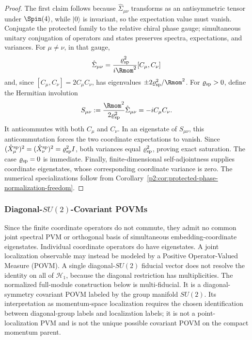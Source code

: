 \documentclass[11pt,a4paper]{article}
\begin{document}
\begin{proof}
The first claim follows because \(\hat\Sigma_{\mu\nu}\) transforms as an
antisymmetric tensor under \(\Spin(4)\), while \(|0\rangle\) is invariant,
so the expectation value must vanish.  Conjugate the protected family to the
relative chiral phase gauge; simultaneous unitary conjugation of operators
and states preserves spectra, expectations, and variances.  For
\(\mu\ne\nu\), in that gauge,
\[
\hat\Sigma_{\mu\nu}
=\frac{\varrho_{\rm sp}^2}{i\Rmom^2}[C_\mu,C_\nu]
\]
and, since \([C_\mu,C_\nu]=2C_\mu C_\nu\), has eigenvalues
\(\pm2\varrho_{\rm sp}^2/\Rmom^2\).  For
\(\varrho_{\rm sp}>0\), define the Hermitian involution
\[
S_{\mu\nu}
:=
\frac{\Rmom^2}{2\varrho_{\rm sp}^2}\hat\Sigma_{\mu\nu}
=-iC_\mu C_\nu.
\]
It anticommutes with both \(C_\mu\) and \(C_\nu\).  In an eigenstate of
\(S_{\mu\nu}\), this anticommutation forces the two coordinate expectations
to vanish.  Since
\((\hat X_\mu^{\rm sp})^2=(\hat X_\nu^{\rm sp})^2
=\varrho_{\rm sp}^2I\), both variances equal
\(\varrho_{\rm sp}^2\), proving exact saturation.  The case
\(\varrho_{\rm sp}=0\) is immediate.  Finally, finite-dimensional
self-adjointness supplies coordinate eigenstates, whose corresponding
coordinate variance is zero.  The numerical specializations follow from
Corollary~\ref{p2:cor:protected-phase-normalization-freedom}.
\end{proof}


\subsubsection{Diagonal-\texorpdfstring{$SU(2)$}{SU(2)}-Covariant POVMs}
Since the finite coordinate operators do not commute, they admit no common
joint spectral PVM or orthogonal basis of simultaneous embedding-coordinate
eigenstates.  Individual coordinate operators do have eigenstates.  A
joint localization observable may instead be modeled by a Positive
Operator-Valued Measure (POVM).  A single diagonal-$SU(2)$ fiducial vector
does not resolve the identity on all of $\mathcal H_1$, because the diagonal
restriction has multiplicities.  The normalized full-module construction
below is multi-fiducial.  It is a diagonal-symmetry covariant POVM labeled by
the group manifold $SU(2)$.  Its interpretation as momentum-space
localization requires the chosen identification between diagonal-group
labels and localization labels; it is not a point-localization PVM and is not
the unique possible covariant POVM on the compact momentum parent.
\end{document}

